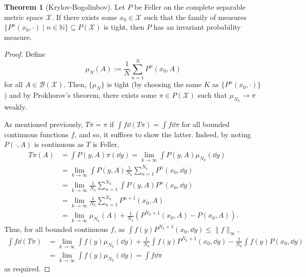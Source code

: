 \documentclass[]{article}
\theoremstyle{definition}
\newtheorem{theorem}{Theorem}
\theoremstyle{definition}
\begin{document}
\begin{theorem}[Krylov-Bogoliubov]
  Let \(P\) be Feller on the complete separable metric space \(\mathcal{X}\). 
  If there exists some \(x_0 \in \mathcal{X}\) such that the family of measures
  \(\{P^n(x_0, \cdot) \mid n \in \mathbb{N}\} \subseteq P(\mathcal{X})\) is 
  tight, then \(P\) has an invariant probability measure.
\end{theorem}
\begin{proof}
  Define 
  \[\mu_N(A) := \frac{1}{N} \sum_{n = 1}^N P^n(x_0, A)\]
  for all \(A \in \mathcal{B}(\mathcal{X})\). Then, \(\{\mu_N\}\) is tight 
  (by choosing the same \(K\) as \(\{P^n(x_0, \cdot)\}\))
  and by Prokhorov's theorem, there exists some \(\pi \in P(\mathcal{X})\) 
  such that \(\mu_{N_k} \to \pi\) weakly.

  As mentioned previously, \(T\pi = \pi\) if \(\int f \dd(T\pi) = \int f \dd \pi\) 
  for all bounded continuous functions \(f\), and so, it suffices to show the latter.
  Indeed, by noting \(P(\cdot, A)\) is continuous as \(T\) is Feller, 
  \[\begin{split}
    T\pi(A) & = \int P(y, A) \pi(\dd y) = \lim_{k \to \infty} \int P(y, A) \mu_{N_k}(\dd y)\\
    & = \lim_{k \to \infty} \int P(y, A) \frac{1}{N_k} \sum_{n = 1}^{N_k} P^n(x_0, \dd y)\\
    & = \lim_{k \to \infty} \frac{1}{N_k} \sum_{n = 1}^{N_k} \int P(y, A) P^n(x_0, \dd y)\\
    & = \lim_{k \to \infty} \frac{1}{N_k} \sum_{n = 1}^{N_k}P^{n + 1}(x_0, A)\\
    & = \lim_{k \to \infty} \mu_{N_k}(A) + \frac{1}{N_k}(P^{N_k + 1}(x_0, A) - P(x_0, A)).
  \end{split}\]
  Thus, for all bounded continuous \(f\), as 
  \(\int f(y) P^{N_k + 1}(x_0, \dd y) \le \|f\|_\infty\), 
  \[\begin{split}
    \int f \dd(T\pi) & = 
    \lim_{k \to \infty} \int f(y) \mu_{N_k}(\dd y) 
    + \frac{1}{N_k} \int f(y) P^{N_k + 1}(x_0, \dd y) 
    - \frac{1}{N_k} \int f(y) P(x_0, \dd y)\\
    & = \lim_{k \to \infty} \int f(y) \mu_{N_k}(\dd y) = \int f \dd \pi
  \end{split}\]
  as required.
\end{proof}
\end{document}
